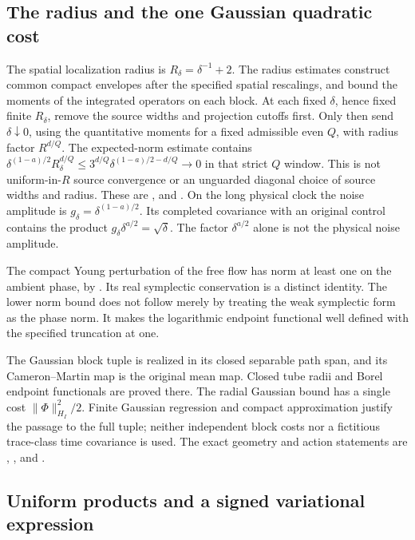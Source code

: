 \subsection{The radius and the one Gaussian quadratic cost}

The spatial localization radius is $R_\delta = \delta^{-1}+2$. The radius
estimates construct common compact envelopes after the specified spatial
rescalings, and bound the moments of the integrated operators on each block. At
each fixed $\delta$, hence fixed finite $R_\delta$, remove the source widths and
projection cutoffs first. Only then send $\delta\downarrow0$, using the
quantitative moments for a fixed admissible even $Q$, with radius factor
$R^{d/Q}$. The expected-norm estimate contains $\delta^{(1-a)/2}R_\delta^{d/Q}
\le 3^{d/Q} \delta^{(1-a)/2-d/Q} \to 0$ in that strict $Q$ window. This is not
uniform-in-$R$ source convergence or an unguarded diagonal choice of source
widths and radius. These are ,
 and . On the long physical
clock the noise amplitude is $g_\delta = \delta^{(1-a)/2}$. Its completed
covariance with an original control contains the product $g_\delta\delta^{a/2} =
\sqrt\delta$. The factor $\delta^{a/2}$ alone is not the physical noise
amplitude.

The compact Young perturbation of the free flow has norm at least one on the
ambient phase, by . Its real symplectic
conservation is a distinct identity. The lower norm bound does not follow merely
by treating the weak symplectic form as the phase norm. It makes the logarithmic
endpoint functional well defined with the specified truncation at one.

The Gaussian block tuple is realized in its closed separable path span, and its
Cameron--Martin map is the original mean map. Closed tube radii and Borel
endpoint functionals are proved there. The radial Gaussian bound has a single
cost $\|\Phi\|_{H_I}^2/2$. Finite Gaussian regression and compact approximation
justify the passage to the full tuple; neither independent block costs nor a
fictitious trace-class time covariance is used. The exact geometry and action
statements are ,
,
 and
.

\subsection{Uniform products and a signed variational expression}

